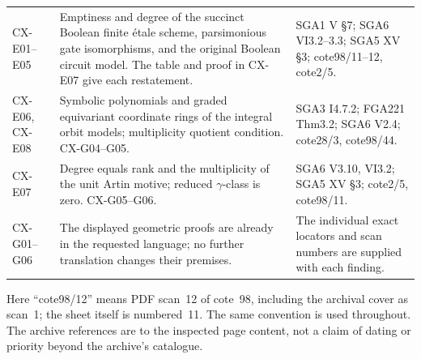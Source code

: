 \begin{longtable}{@{}p{}p{}p{}@{}}
CX-E01--E05 & Emptiness and degree of the succinct Boolean finite étale scheme, parsimonious gate isomorphisms, and the original Boolean circuit model. The table and proof in CX-E07 give each restatement. & SGA1 V \S7; SGA6 VI3.2--3.3; SGA5 XV \S3; cote98/11--12, cote2/5.\\
CX-E06, CX-E08 & Symbolic polynomials and graded equivariant coordinate rings of the integral orbit models; multiplicity quotient condition. CX-G04--G05. & SGA3 I4.7.2; FGA221 Thm3.2; SGA6 V2.4; cote28/3, cote98/44.\\
CX-E07 & Degree equals rank and the multiplicity of the unit Artin motive; reduced $\gamma$-class is zero. CX-G05--G06. & SGA6 V3.10, VI3.2; SGA5 XV \S3; cote2/5, cote98/11.\\
CX-G01--G06 & The displayed geometric proofs are already in the requested language; no further translation changes their premises. & The individual exact locators and scan numbers are supplied with each finding.\\
\bottomrule
\end{longtable}

Here ``cote98/12'' means PDF scan~12 of cote~98, including the archival
cover as scan~1; the sheet itself is numbered~11.  The same convention is
used throughout.  The archive references are to the inspected page content,
not a claim of dating or priority beyond the archive's catalogue.
